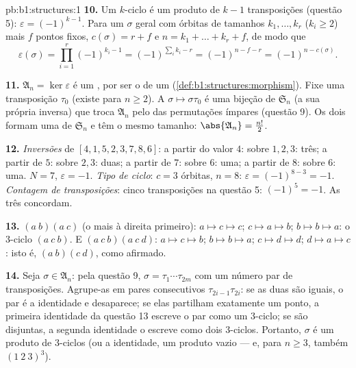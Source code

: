 \begin{solution}{pb:b1:structures:1}
\textbf{10.} Um $k$-ciclo é um produto de $k - 1$ transposições
(questão 5): $\varepsilon = (-1)^{k-1}$. Para um $\sigma$ geral
com órbitas de tamanhos $k_1, \dots, k_r$ ($k_i \geq 2$) mais $f$
pontos fixos, $c(\sigma) = r + f$ e $n = k_1 + \dots + k_r + f$,
de modo que
\[
\varepsilon(\sigma) = \prod_{i=1}^r (-1)^{k_i - 1}
= (-1)^{\sum_i k_i - r} = (-1)^{n - f - r} = (-1)^{n -
c(\sigma)} .
\]

\textbf{11.} $\mathfrak A_n = \ker\varepsilon$ é um , por ser o
 de um  (\cref{def:b1:structures:morphism}). Fixe
uma transposição $\tau_0$ (existe para $n \geq 2$). A  $\sigma
\mapsto \sigma\tau_0$ é uma bijeção de $\mathfrak S_n$ (a sua própria
inversa) que troca $\mathfrak A_n$ pelo  das
permutações ímpares (questão 9). Os dois  formam uma 
de $\mathfrak S_n$ e têm o mesmo tamanho: $\abs{\mathfrak A_n} = \frac{n!}2$.

\textbf{12.} \emph{Inversões} de $[4, 1, 5, 2, 3, 7, 8, 6]$: a partir do
valor $4$: sobre $1, 2, 3$: três; a partir de $5$: sobre $2, 3$: duas;
a partir de $7$: sobre $6$: uma; a partir de $8$: sobre $6$: uma. $N = 7$,
$\varepsilon = -1$. \emph{Tipo de ciclo}: $c = 3$ órbitas, $n = 8$:
$\varepsilon = (-1)^{8-3} = -1$. \emph{Contagem de transposições}: cinco
transposições na questão 5: $(-1)^5 = -1$. As três concordam.

\textbf{13.} $(a\ b)(a\ c)$ (o mais à direita primeiro): $a \mapsto c
\mapsto c$; $c \mapsto a \mapsto b$; $b \mapsto b \mapsto a$:
o $3$-ciclo $(a\ c\ b)$. E $(a\ c\ b)(a\ c\ d)$: $a \mapsto c
\mapsto b$; $b \mapsto b \mapsto a$; $c \mapsto d \mapsto d$; $d
\mapsto a \mapsto c$: isto é, $(a\ b)(c\ d)$, como afirmado.

\textbf{14.} Seja $\sigma \in \mathfrak A_n$: pela questão 9,
$\sigma = \tau_1\cdots\tau_{2m}$ com um número par de
transposições. Agrupe-as em pares consecutivos
$\tau_{2i-1}\tau_{2i}$: se as duas são iguais, o par é a
identidade e desaparece; se elas partilham exatamente um ponto, a
primeira identidade da questão 13 escreve o par como um $3$-ciclo;
se são disjuntas, a segunda identidade o escreve como dois
$3$-ciclos. Portanto, $\sigma$ é um produto de $3$-ciclos (ou a
identidade, um produto vazio --- e, para $n \geq 3$, também $(1\ 2\
3)^3$).


\end{solution}
